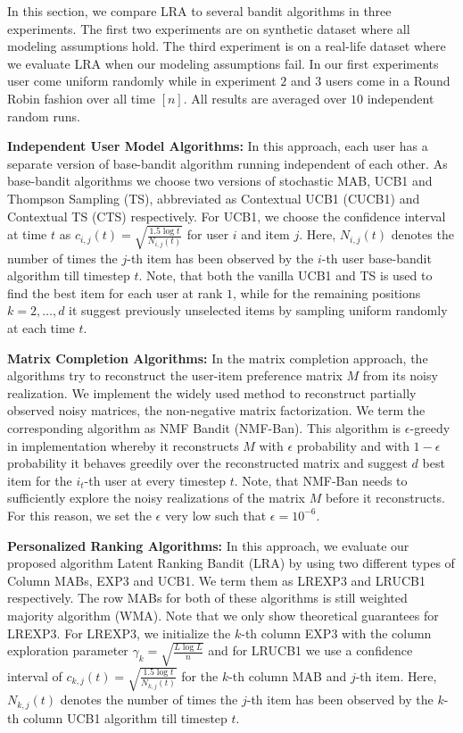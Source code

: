 In this section, we compare LRA to several bandit algorithms in three experiments. The first two experiments are on synthetic dataset where all modeling assumptions hold. The third experiment is on a real-life dataset where we evaluate LRA when our modeling assumptions fail. In our first experiments user come uniform randomly while in experiment $2$ and $3$  users come in a Round Robin fashion over all time $[n]$. All results are averaged over $10$ independent random runs.

\textbf{Independent User Model Algorithms:} In this approach, each user has a separate version of base-bandit algorithm running independent of each other. As base-bandit algorithms we choose two versions of stochastic MAB, UCB1 and Thompson Sampling (TS), abbreviated as Contextual UCB1 (CUCB1) and Contextual TS (CTS) respectively. For UCB1, we choose the confidence interval at time $t$ as $c_{i, j}(t) = \sqrt{\frac{1.5 \log t}{N_{i, j}(t)}}$ for user $i$ and item $j$. Here, $N_{i, j}(t)$ denotes the number of times the $j$-th item has been observed by the $i$-th user base-bandit algorithm till timestep $t$. Note, that both the vanilla UCB1 and TS is used to find the best item for each user at rank $1$, while for the remaining positions $k= 2,\dots, d$ it suggest previously unselected items by sampling uniform randomly at each time $t$. 

\textbf{Matrix Completion Algorithms:} In the matrix completion approach, the algorithms try to reconstruct the user-item preference matrix $M$ from its noisy realization. We implement the widely used method to reconstruct partially observed noisy matrices, the non-negative matrix factorization. We term the corresponding algorithm as NMF Bandit (NMF-Ban). This algorithm is $\epsilon$-greedy in implementation whereby it reconstructs $M$ with $\epsilon$ probability and with $1-\epsilon$ probability it behaves greedily over the reconstructed matrix and suggest $d$ best item for the $i_t$-th user at every timestep $t$. Note, that NMF-Ban needs to sufficiently explore the noisy realizations of the matrix $M$ before it reconstructs. For this reason, we set the $\epsilon$ very low such that $\epsilon = 10^{-6}$.


\textbf{Personalized Ranking Algorithms:} In this approach, we evaluate our proposed algorithm Latent Ranking Bandit (LRA) by using two different types of Column MABs, EXP3 and UCB1. We term them as LREXP3 and LRUCB1 respectively. The row MABs for both of these algorithms is still weighted majority algorithm (WMA). Note that we only show theoretical guarantees for LREXP3. For LREXP3,  we initialize the $k$-th column EXP3 with the column exploration parameter $\gamma_k = \sqrt{\frac{L \log L}{n}}$ and for LRUCB1 we use  a confidence interval of $c_{k, j}(t) = \sqrt{\frac{1.5 \log t}{N_{k,j}(t)}}$  for the $k$-th column MAB and $j$-th item. Here, $N_{k, j}(t)$ denotes the number of times the $j$-th item has been observed by the $k$-th column UCB1 algorithm till timestep $t$.

